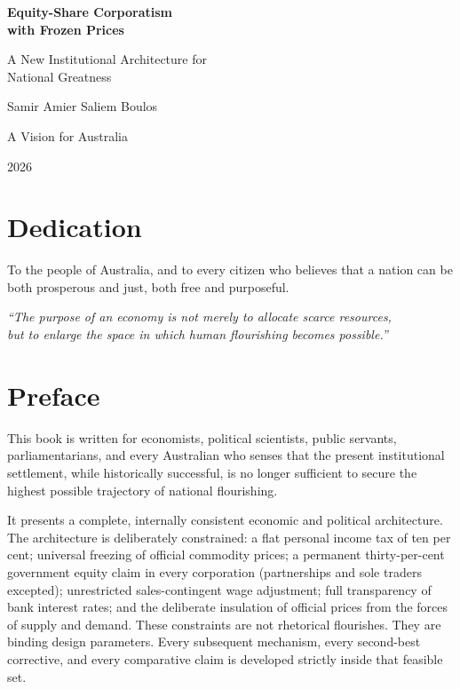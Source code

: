 \documentclass[12pt,anyside]{book}
\theoremstyle{definition}
\theoremstyle{plain}
\theoremstyle{remark}
\begin{document}
\frontmatter

\begin{titlepage}
\centering
\vspace*{2cm}
{\Huge\bfseries Equity-Share Corporatism\\[0.4cm] with Frozen Prices\par}
\vspace{1.5cm}
{\LARGE A New Institutional Architecture for\\[0.3cm] National Greatness\par}
\vspace{2cm}
{\Large Samir Amier Saliem Boulos\par}
\vspace{1cm}
{\large A Vision for Australia\par}
\vfill
{\large 2026\par}
\end{titlepage}

\chapter*{Dedication}
\thispagestyle{empty}
To the people of Australia, and to every citizen who believes that a nation can be both prosperous and just, both free and purposeful.
\vspace{2cm}
\begin{center}
\textit{``The purpose of an economy is not merely to allocate scarce resources,\\ but to enlarge the space in which human flourishing becomes possible.''}
\end{center}

\chapter*{Preface}

This book is written for economists, political scientists, public servants, parliamentarians, and every Australian who senses that the present institutional settlement, while historically successful, is no longer sufficient to secure the highest possible trajectory of national flourishing.

It presents a complete, internally consistent economic and political architecture. The architecture is deliberately constrained: a flat personal income tax of ten per cent; universal freezing of official commodity prices; a permanent thirty-per-cent government equity claim in every corporation (partnerships and sole traders excepted); unrestricted sales-contingent wage adjustment; full transparency of bank interest rates; and the deliberate insulation of official prices from the forces of supply and demand. These constraints are not rhetorical flourishes. They are binding design parameters. Every subsequent mechanism, every second-best corrective, and every comparative claim is developed strictly inside that feasible set.
\end{document}
